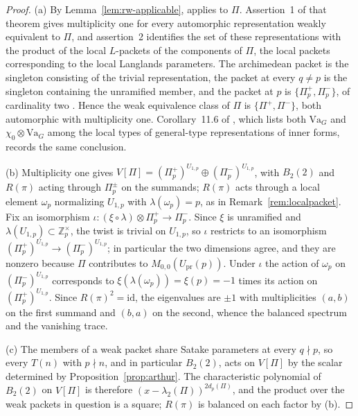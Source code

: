 \documentclass[11pt]{amsart}
\theoremstyle{plain}
\theoremstyle{definition}
\newcommand{\Z}{\mathbb{Z}}
\newcommand{\Upr}{U_{\mathrm{pr}}}
\newcommand{\Va}{\mathrm{Va}}
\providecommand{\Upr}{U_{\mathrm{pr}}}
\providecommand{\Va}{\mathrm{Va}}
\begin{document}
	\begin{proof}
		\textup{(a)} By Lemma~\ref{lem:rw-applicable},
		\cite[Thm.~11.4]{RoesnerWeissauer2021} applies to $\Pi$.
		Assertion~1 of that theorem gives multiplicity one for every
		automorphic representation weakly equivalent to $\Pi$, and
		assertion~2 identifies the set of these representations with the
		product of the local $L$-packets of the components of $\Pi$, the
		local packets corresponding to the local Langlands parameters. The
		archimedean packet is the singleton consisting of the trivial
		representation, the packet at every $q\ne p$ is the singleton
		containing the unramified member, and the packet at $p$ is
		$\{\Pi_p^+,\Pi_p^-\}$, of cardinality two
		\cite[Main Thm.~(ii), \S7.2]{GanTantono}. Hence the weak
		equivalence class of $\Pi$ is $\{\Pi^+,\Pi^-\}$, both automorphic
		with multiplicity one. Corollary~11.6 of
		\cite{RoesnerWeissauer2021}, which lists both $\Va_G$ and
		$\chi_0\otimes\Va_G$ among the local types of general-type
		representations of inner forms, records the same conclusion.
		
		\textup{(b)} Multiplicity one gives
		$V[\Pi]=(\Pi_p^+)^{U_{1,p}}\oplus(\Pi_p^-)^{U_{1,p}}$, with
		$B_2(2)$ and $R(\pi)$ acting through $\Pi_p^{\pm}$ on the summands;
		$R(\pi)$ acts through a local element $\omega_p$ normalizing
		$U_{1,p}$ with $\lambda(\omega_p)=p$, as in
		Remark~\ref{rem:localpacket}. Fix an isomorphism
		$\iota\colon(\xi\circ\lambda)\otimes\Pi_p^+\to\Pi_p^-$. Since $\xi$
		is unramified and $\lambda(U_{1,p})\subset\Z_p^\times$, the twist
		is trivial on $U_{1,p}$, so $\iota$ restricts to an isomorphism
		$(\Pi_p^+)^{U_{1,p}}\to(\Pi_p^-)^{U_{1,p}}$; in particular the two
		dimensions agree, and they are nonzero because $\Pi$ contributes to
		$M_{0,0}(\Upr(p))$. Under $\iota$ the action of $\omega_p$ on
		$(\Pi_p^-)^{U_{1,p}}$ corresponds to
		$\xi(\lambda(\omega_p))=\xi(p)=-1$ times its action on
		$(\Pi_p^+)^{U_{1,p}}$. Since $R(\pi)^2=\mathrm{id}$, the
		eigenvalues are $\pm1$ with multiplicities $(a,b)$ on the first
		summand and $(b,a)$ on the second, whence the balanced spectrum and
		the vanishing trace.
		
		\textup{(c)} The members of a weak packet share Satake parameters
		at every $q\nmid p$, so every $T(n)$ with $p\nmid n$, and in
		particular $B_2(2)$, acts on $V[\Pi]$ by the scalar determined by
		Proposition~\ref{prop:arthur}. The characteristic polynomial of
		$B_2(2)$ on $V[\Pi]$ is therefore
		$(x-\lambda_2(\Pi))^{2d_p(\Pi)}$, and the product over the weak
		packets in question is a square; $R(\pi)$ is balanced on each
		factor by \textup{(b)}.
		

\end{proof}
\end{document}
